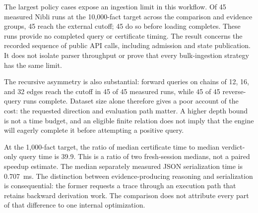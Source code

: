 The largest policy cases expose an ingestion limit in this workflow. Of 45 measured Nibli runs at the 10,000-fact target across the comparison and evidence groups, 45 reach the external cutoff; 45 do so before loading completes. These runs provide no completed query or certificate timing. The result concerns the recorded sequence of public API calls, including admission and state publication. It does not isolate parser throughput or prove that every bulk-ingestion strategy has the same limit.

The recursive asymmetry is also substantial: forward queries on chains of 12, 16, and 32 edges reach the cutoff in 45 of 45 measured runs, while 45 of 45 reverse-query runs complete. Dataset size alone therefore gives a poor account of the cost: the requested direction and evaluation path matter. A higher depth bound is not a time budget, and an eligible finite relation does not imply that the engine will eagerly complete it before attempting a positive query.

At the 1,000-fact target, the ratio of median certificate time to median verdict-only query time is 39.9. This is a ratio of two fresh-session medians, not a paired speedup estimate. The median separately measured JSON serialization time is 0.707~ms. The distinction between evidence-producing reasoning and serialization is consequential: the former requests a trace through an execution path that retains backward derivation work. The comparison does not attribute every part of that difference to one internal optimization.

